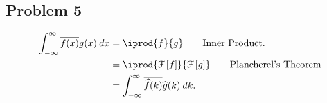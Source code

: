 \documentclass[10pt]{mypackage}
\begin{document}
\subsection{Problem 5}%
\begin{align*}
  \int_{-\infty}^{\infty} \overline{f(x)}g(x)\:dx &= \iprod{f}{g}\tag*{Inner Product.}\\
                                                  &= \iprod{\mathcal{F}\left[f\right]}{\mathcal{F}\left[g\right]}\tag*{Plancherel's Theorem}\\
                                                  &= \int_{-\infty}^{\infty} \overline{\widehat{f}(k)}\widehat{g}(k)\:dk.
\end{align*}
\end{document}

